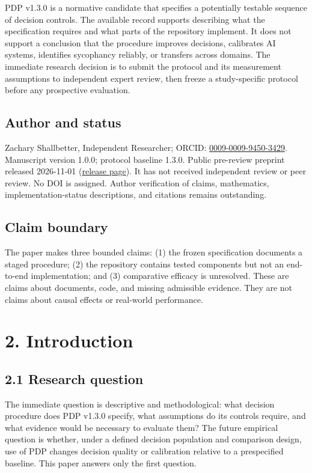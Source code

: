 \documentclass[
  english,
]{article}
\begin{document}
PDP v1.3.0 is a normative candidate that specifies a potentially
testable sequence of decision controls. The available record supports
describing what the specification requires and what parts of the
repository implement. It does not support a conclusion that the
procedure improves decisions, calibrates AI systems, identifies
sycophancy reliably, or transfers across domains. The immediate research
decision is to submit the protocol and its measurement assumptions to
independent expert review, then freeze a study-specific protocol before
any prospective evaluation.

\subsection{Author and status}\label{author-and-status}

Zachary Shallbetter, Independent Researcher; ORCID:
\href{https://orcid.org/0009-0009-9450-3429}{0009-0009-9450-3429}.
Manuscript version 1.0.0; protocol baseline 1.3.0. Public pre-review
preprint released 2026-11-01
(\href{https://github.com/zachshallbetter/polymorphic-decision-protocol/releases/tag/v1.4.1}{release
page}). It has not received independent review or peer review. No DOI is
assigned. Author verification of claims, mathematics,
implementation-status descriptions, and citations remains outstanding.

\subsection{Claim boundary}\label{claim-boundary}

The paper makes three bounded claims: (1) the frozen specification
documents a staged procedure; (2) the repository contains tested
components but not an end-to-end implementation; and (3) comparative
efficacy is unresolved. These are claims about documents, code, and
missing admissible evidence. They are not claims about causal effects or
real-world performance.

\section{2. Introduction}\label{introduction}

\subsection{2.1 Research question}\label{research-question}

The immediate question is descriptive and methodological: what decision
procedure does PDP v1.3.0 specify, what assumptions do its controls
require, and what evidence would be necessary to evaluate them? The
future empirical question is whether, under a defined decision
population and comparison design, use of PDP changes decision quality or
calibration relative to a prespecified baseline. This paper answers only
the first question.
\end{document}
